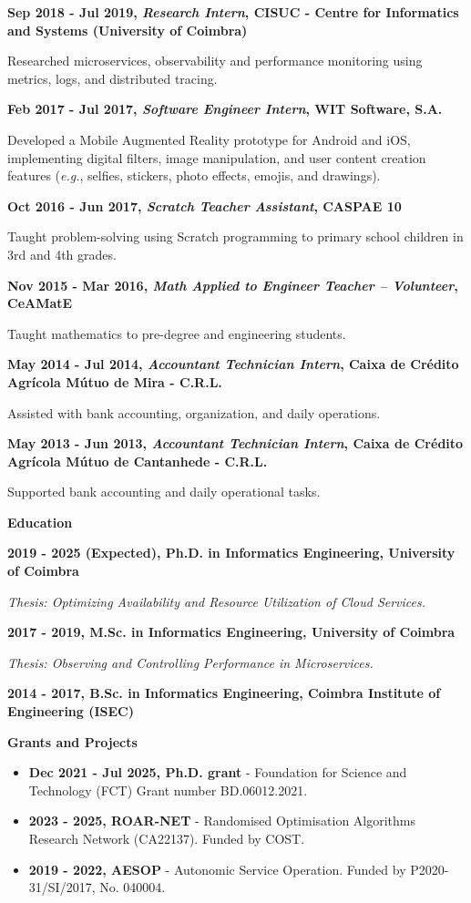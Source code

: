 \documentclass[a4paper,9pt]{memoir}
\newcommand{\Sep}{\vspace{1em}} %
\newcommand{\SmallSep}{\vspace{0.5em}} %
\newcommand{\CVSection}[1]{ %
    {\Large\textbf{#1}}\par
    \SmallSep %
}
\newcommand{\CVItem}[2]{ %
    \textbf{\color{RoyalBlue} #1}\par
    #2
    \SmallSep %
}
\begin{document}
\CVItem{Sep 2018 - Jul 2019, \textit{Research Intern}, CISUC - Centre for Informatics and Systems (University of Coimbra)}{
    Researched microservices, observability and performance monitoring using metrics, logs, and distributed tracing.
}

\CVItem{Feb 2017 - Jul 2017, \textit{Software Engineer Intern}, WIT Software, S.A.}{
    Developed a Mobile Augmented Reality prototype for Android and iOS, implementing digital filters, image manipulation, and user content creation features (\textit{e.g.}, selfies, stickers, photo effects, emojis, and drawings).

}

\CVItem{Oct 2016 - Jun 2017, \textit{Scratch Teacher Assistant}, CASPAE 10}{
    Taught problem-solving using Scratch programming to primary school children in 3rd and 4th grades.
}

\CVItem{Nov 2015 - Mar 2016, \textit{Math Applied to Engineer Teacher -- Volunteer}, CeAMatE}{
    Taught mathematics to pre-degree and engineering students.
}

\CVItem{May 2014 - Jul 2014, \textit{Accountant Technician Intern}, Caixa de Crédito Agrícola Mútuo de Mira - C.R.L.}{
    Assisted with bank accounting, organization, and daily operations.
}

\CVItem{May 2013 - Jun 2013, \textit{Accountant Technician Intern}, Caixa de Crédito Agrícola Mútuo de Cantanhede - C.R.L.}{
    Supported bank accounting and daily operational tasks.
}

\Sep

\CVSection{Education}

\CVItem{2019 - 2025 (Expected), Ph.D. in Informatics Engineering, University of Coimbra}{
\emph{Thesis: Optimizing Availability and Resource Utilization of Cloud Services.}
}

\CVItem{2017 - 2019, M.Sc. in Informatics Engineering, University of Coimbra}{\emph{Thesis: Observing and Controlling Performance in Microservices.}}

\CVItem{2014 - 2017, B.Sc. in Informatics Engineering, Coimbra Institute of Engineering (ISEC)}

\Sep

\CVSection{Grants and Projects}

\begin{itemize}[leftmargin=*]
    \item \textbf{Dec 2021 - Jul 2025, Ph.D. grant} - Foundation for Science and Technology (FCT) Grant number BD.06012.2021.
    \item \textbf{2023 - 2025, ROAR-NET} - Randomised Optimisation Algorithms Research Network (CA22137). Funded by COST.
    \item \textbf{2019 - 2022, AESOP} - Autonomic Service Operation. Funded by P2020-31/SI/2017, No. 040004.
\end{itemize}
\end{document}
